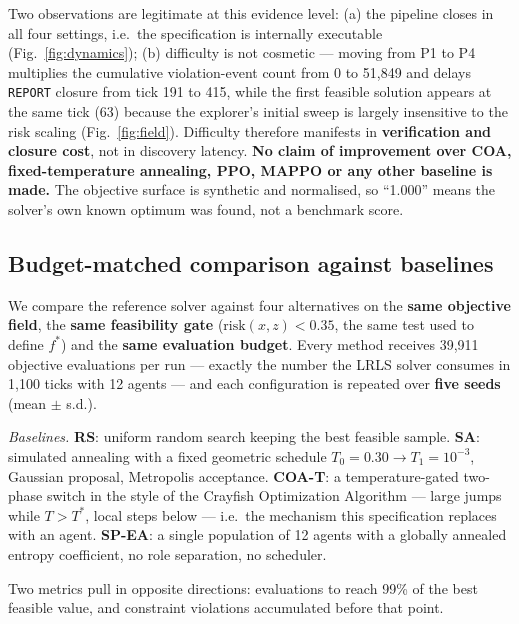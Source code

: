 \documentclass[11pt,a4paper]{article}
\begin{document}
Two observations are legitimate at this evidence level: (a) the pipeline closes in all four settings, i.e.\ the specification is internally executable (Fig.~\ref{fig:dynamics}); (b) difficulty is not cosmetic --- moving from P1 to P4 multiplies the cumulative violation-event count from 0 to 51{,}849 and delays \texttt{REPORT} closure from tick 191 to 415, while the first feasible solution appears at the same tick (63) because the explorer's initial sweep is largely insensitive to the risk scaling (Fig.~\ref{fig:field}). Difficulty therefore manifests in \textbf{verification and closure cost}, not in discovery latency. \textbf{No claim of improvement over COA, fixed-temperature annealing, PPO, MAPPO or any other baseline is made.} The objective surface is synthetic and normalised, so ``1.000'' means the solver's own known optimum was found, not a benchmark score.


\subsection{Budget-matched comparison against baselines}
\label{sec:baselines}

We compare the reference solver against four alternatives on the \textbf{same objective field}, the \textbf{same feasibility gate} ($\mathrm{risk}(x,z)<0.35$, the same test used to define $f^\ast$) and the \textbf{same evaluation budget}. Every method receives 39{,}911 objective evaluations per run --- exactly the number the LRLS solver consumes in 1{,}100 ticks with 12 agents --- and each configuration is repeated over \textbf{five seeds} (mean $\pm$ s.d.).

\emph{Baselines.} \textbf{RS}: uniform random search keeping the best feasible sample. \textbf{SA}: simulated annealing with a fixed geometric schedule $T_0{=}0.30\to T_1{=}10^{-3}$, Gaussian proposal, Metropolis acceptance. \textbf{COA-T}: a temperature-gated two-phase switch in the style of the Crayfish Optimization Algorithm --- large jumps while $T>T^\ast$, local steps below --- i.e.\ the mechanism this specification replaces with an agent. \textbf{SP-EA}: a single population of 12 agents with a globally annealed entropy coefficient, no role separation, no scheduler.

Two metrics pull in opposite directions: evaluations to reach 99\% of the best feasible value, and constraint violations accumulated before that point.
\end{document}
